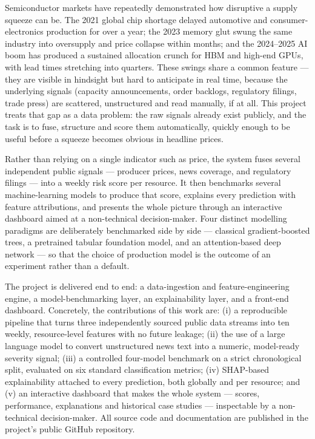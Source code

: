 \documentclass[11pt]{article}
\begin{document}
Semiconductor markets have repeatedly demonstrated how disruptive a supply squeeze can be. The 2021 global chip shortage delayed automotive and consumer-electronics production for over a year; the 2023 memory glut swung the same industry into oversupply and price collapse within months; and the 2024--2025 AI boom has produced a sustained allocation crunch for HBM and high-end GPUs, with lead times stretching into quarters. These swings share a common feature --- they are visible in hindsight but hard to anticipate in real time, because the underlying signals (capacity announcements, order backlogs, regulatory filings, trade press) are scattered, unstructured and read manually, if at all. This project treats that gap as a data problem: the raw signals already exist publicly, and the task is to fuse, structure and score them automatically, quickly enough to be useful before a squeeze becomes obvious in headline prices.

Rather than relying on a single indicator such as price, the system fuses several independent public signals --- producer prices, news coverage, and regulatory filings --- into a weekly risk score per resource. It then benchmarks several machine-learning models to produce that score, explains every prediction with feature attributions, and presents the whole picture through an interactive dashboard aimed at a non-technical decision-maker. Four distinct modelling paradigms are deliberately benchmarked side by side --- classical gradient-boosted trees, a pretrained tabular foundation model, and an attention-based deep network --- so that the choice of production model is the outcome of an experiment rather than a default.

The project is delivered end to end: a data-ingestion and feature-engineering engine, a model-benchmarking layer, an explainability layer, and a front-end dashboard. Concretely, the contributions of this work are: (i) a reproducible pipeline that turns three independently sourced public data streams into ten weekly, resource-level features with no future leakage; (ii) the use of a large language model to convert unstructured news text into a numeric, model-ready severity signal; (iii) a controlled four-model benchmark on a strict chronological split, evaluated on six standard classification metrics; (iv) SHAP-based explainability attached to every prediction, both globally and per resource; and (v) an interactive dashboard that makes the whole system --- scores, performance, explanations and historical case studies --- inspectable by a non-technical decision-maker. All source code and documentation are published in the project's public GitHub repository.
\end{document}

